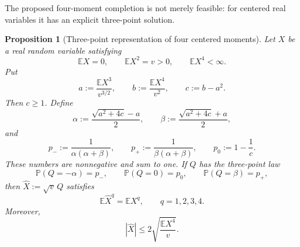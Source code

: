 \documentclass[11pt]{article}
\newtheorem{proposition}[theorem]{Proposition}
\theoremstyle{definition}
\theoremstyle{remark}
\newcommand{\E}{\mathbb E}
\begin{document}
The proposed four-moment completion is not merely feasible: for centered real
variables it has an explicit three-point solution.

\begin{proposition}[Three-point representation of four centered moments]
\label{prop:three-point-package}
Let \(X\) be a real random variable satisfying
\begin{equation}\label{eq:X-moments-package}
 \E X=0,
 \qquad
 \E X^2=v>0,
 \qquad
 \E X^4<\infty.
\end{equation}
Put
\begin{equation}\label{eq:standard-moments-package}
 a:=\frac{\E X^3}{v^{3/2}},
 \qquad
 b:=\frac{\E X^4}{v^2},
 \qquad
 c:=b-a^2.
\end{equation}
Then \(c\ge1\).  Define
\begin{equation}\label{eq:alpha-beta-package}
 \alpha:=\frac{\sqrt{a^2+4c}-a}{2},
 \qquad
 \beta:=\frac{\sqrt{a^2+4c}+a}{2},
\end{equation}
and
\begin{equation}\label{eq:three-probs-package}
 p_-:=\frac{1}{\alpha(\alpha+\beta)},
 \qquad
 p_+:=\frac{1}{\beta(\alpha+\beta)},
 \qquad
 p_0:=1-\frac1c.
\end{equation}
These numbers are nonnegative and sum to one.  If \(Q\) has the three-point
law
\begin{equation}\label{eq:Q-law-package}
 \mathbb P(Q=-\alpha)=p_-,
 \qquad
 \mathbb P(Q=0)=p_0,
 \qquad
 \mathbb P(Q=\beta)=p_+,
\end{equation}
then \(\widehat X:=\sqrt v\,Q\) satisfies
\begin{equation}\label{eq:four-exact-package}
 \E\widehat X^q=\E X^q,
 \qquad q=1,2,3,4.
\end{equation}
Moreover,
\begin{equation}\label{eq:support-three-package}
 |\widehat X|
 \le2\sqrt{\frac{\E X^4}{v}}.
\end{equation}
\end{proposition}
\end{document}
